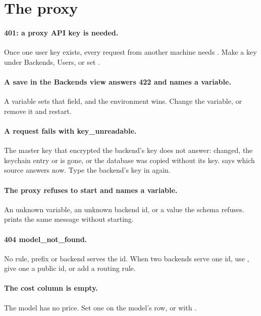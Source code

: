 \section{The proxy}

\paragraph{401: a proxy API key is needed.} Once one user key exists, every request from another machine needs . Make a key under Backends, Users, or set .

\paragraph{A save in the Backends view answers 422 and names a variable.} A  variable sets that field, and the environment wins. Change the variable, or remove it and restart.

\paragraph{A request fails with key\_unreadable.} The master key that encrypted the backend's key does not answer:  changed, the keychain entry or  is gone, or the database was copied without its key.  says which source answers now. Type the backend's key in again.

\paragraph{The proxy refuses to start and names a variable.} An unknown  variable, an unknown backend id, or a value the schema refuses.  prints the same message without starting.

\paragraph{404 model\_not\_found.} No rule, prefix or backend serves the id. When two backends serve one id, use , give one a public id, or add a routing rule.

\paragraph{The cost column is empty.} The model has no price. Set one on the model's row, or with .

